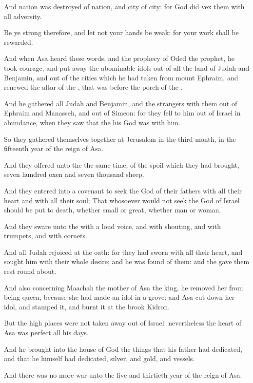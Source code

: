 \Verse And nation was destroyed of nation, and city of city: for God did vex them with all adversity.

\Verse Be ye strong therefore, and let not your hands be weak: for your work shall be rewarded.

\Verse And when Asa heard these words, and the prophecy of Oded the prophet, he took courage, and put away the abominable idols out of all the land of Judah and Benjamin, and out of the cities which he had taken from mount Ephraim, and renewed the altar of the \LORD, that was before the porch of the \LORD.

\Verse And he gathered all Judah and Benjamin, and the strangers with them out of Ephraim and Manasseh, and out of Simeon: for they fell to him out of Israel in abundance, when they saw that the \LORD his God was with him.

\Verse So they gathered themselves together at Jerusalem in the third month, in the fifteenth year of the reign of Asa.

\Verse And they offered unto the \LORD the same time, of the spoil which they had brought, seven hundred oxen and seven thousand sheep.

\Verse And they entered into a covenant to seek the \LORD God of their fathers with all their heart and with all their soul; \Verse That whosoever would not seek the \LORD God of Israel should be put to death, whether small or great, whether man or woman.

\Verse And they sware unto the \LORD with a loud voice, and with shouting, and with trumpets, and with cornets.

\Verse And all Judah rejoiced at the oath: for they had sworn with all their heart, and sought him with their whole desire; and he was found of them: and the \LORD gave them rest round about.

\Verse And also concerning Maachah the mother of Asa the king, he removed her from being queen, because she had made an idol in a grove: and Asa cut down her idol, and stamped it, and burnt it at the brook Kidron.

\Verse But the high places were not taken away out of Israel: nevertheless the heart of Asa was perfect all his days.

\Verse And he brought into the house of God the things that his father had dedicated, and that he himself had dedicated, silver, and gold, and vessels.

\Verse And there was no more war unto the five and thirtieth year of the reign of Asa.


